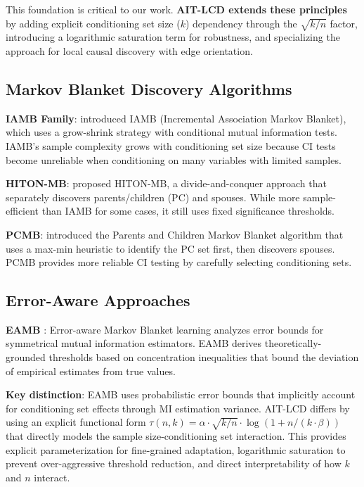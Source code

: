\documentclass{article}
\theoremstyle{plain}
\theoremstyle{definition}
\begin{document}
This foundation is critical to our work. \textbf{AIT-LCD extends these principles} by adding explicit conditioning set size ($k$) dependency through the $\sqrt{k/n}$ factor, introducing a logarithmic saturation term for robustness, and specializing the approach for local causal discovery with edge orientation.

\subsection{Markov Blanket Discovery Algorithms}

\textbf{IAMB Family}: \citet{tsamardinos2003algorithms} introduced IAMB (Incremental Association Markov Blanket), which uses a grow-shrink strategy with conditional mutual information tests. IAMB's sample complexity grows with conditioning set size because CI tests become unreliable when conditioning on many variables with limited samples.

\textbf{HITON-MB}: \citet{aliferis2003hiton} proposed HITON-MB, a divide-and-conquer approach that separately discovers parents/children (PC) and spouses. While more sample-efficient than IAMB for some cases, it still uses fixed significance thresholds.

\textbf{PCMB}: \citet{pena2007towards} introduced the Parents and Children Markov Blanket algorithm that uses a max-min heuristic to identify the PC set first, then discovers spouses. PCMB provides more reliable CI testing by carefully selecting conditioning sets.

\subsection{Error-Aware Approaches}

\textbf{EAMB} \citep{guo2022error}: Error-aware Markov Blanket learning analyzes error bounds for symmetrical mutual information estimators. EAMB derives theoretically-grounded thresholds based on concentration inequalities that bound the deviation of empirical estimates from true values.

\textbf{Key distinction}: EAMB uses probabilistic error bounds that implicitly account for conditioning set effects through MI estimation variance. AIT-LCD differs by using an explicit functional form $\tau(n,k) = \alpha\cdot\sqrt{k/n}\cdot\log(1 + n/(k\cdot\beta))$ that directly models the sample size-conditioning set interaction. This provides explicit parameterization for fine-grained adaptation, logarithmic saturation to prevent over-aggressive threshold reduction, and direct interpretability of how $k$ and $n$ interact.
\end{document}
